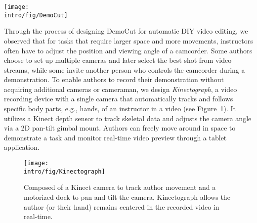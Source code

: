 \begin{figure*}[t]
  \centering
  \texttt{[image: \\intro/fig/DemoCut]}
  \caption{DemoCut asks authors to mark key moments in a recorded video of demonstration using a set of marker types. Based on marker information, the system uses audio and video analysis to automatically organize the video into meaningful segments and apply appropriate video editing effects, which can be modified via a playback UI.}
  \label{fig:democut_intro}
\end{figure*}

Through the process of designing DemoCut for automatic DIY video editing, we observed that for tasks that require larger space and more movements, instructors often have to adjust the position and viewing angle of a camcorder. Some authors choose to set up multiple cameras and later select the best shot from video streams, while some invite another person who controls the camcorder during a demonstration.
%
To enable authors to record their demonstration without acquiring additional cameras or cameraman, we design \emph{Kinectograph}, a video recording device with a single camera that automatically tracks and follows specific body parts, e.g., hands, of an instructor in a video (see Figure~\ref{fig:kinectograph_intro}). It utilizes a Kinect depth sensor to track skeletal data and adjusts the camera angle via a 2D pan-tilt gimbal mount. Authors can freely move around in space to demonstrate a task and monitor real-time video preview through a tablet application.

\begin{figure}[!t]
  \centering
  \texttt{[image: \\intro/fig/Kinectograph]}
  \caption{Composed of a Kinect camera to track author movement and a motorized dock to pan and tilt the camera, Kinectograph allows the author (or their hand) remains centered in the recorded video in real-time.}
\label{fig:kinectograph_intro}
\end{figure}


